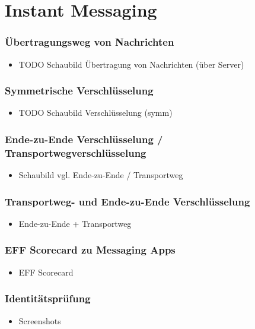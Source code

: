 \section{Instant Messaging}

\begin{frame}
  \frametitle{Übertragungsweg von Nachrichten}
  \begin{itemize}
    \item TODO Schaubild Übertragung von Nachrichten (über Server)
  \end{itemize}
\end{frame}

\begin{frame}
  \frametitle{Symmetrische Verschlüsselung}
  \begin{itemize}
    \item TODO Schaubild Verschlüsselung (symm)
  \end{itemize}
\end{frame}

\begin{frame}
  \frametitle{Ende-zu-Ende Verschlüsselung / Transportwegverschlüsselung}
  \begin{itemize}
    \item Schaubild vgl. Ende-zu-Ende / Transportweg
  \end{itemize}
\end{frame}

\begin{frame}
  \frametitle{Transportweg- und Ende-zu-Ende Verschlüsselung}
  \begin{itemize}
    \item Ende-zu-Ende + Transportweg
  \end{itemize}
\end{frame}

\begin{frame}
  \frametitle{EFF Scorecard zu Messaging Apps}
  \begin{itemize}
    \item EFF Scorecard
  \end{itemize}
\end{frame}

\begin{frame}
  \frametitle{Identitätsprüfung}
  \begin{itemize}
    \item Screenshots
  \end{itemize}
\end{frame}
